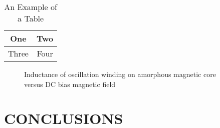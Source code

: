 \documentclass[letterpaper, 10 pt, conference]{ieeeconf}  %
\begin{document}
\begin{table}[h]
\caption{An Example of a Table}
\label{table_example}
\begin{center}
\begin{tabular}{|c||c|}
\hline
One & Two\\
\hline
Three & Four\\
\hline
\end{tabular}
\end{center}
\end{table}


   \begin{figure}[thpb]
      \centering
      \caption{Inductance of oscillation winding on amorphous
       magnetic core versus DC bias magnetic field}
      \label{figurelabel}
   \end{figure}
   

\section{CONCLUSIONS}


\addtolength{\textheight}{-12cm} 













\end{document}

